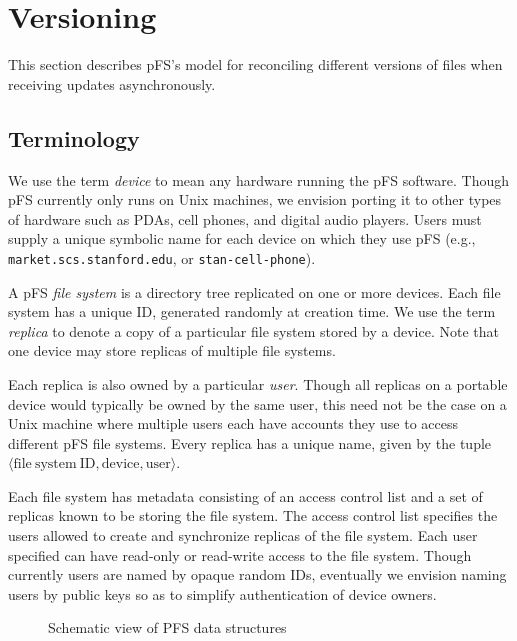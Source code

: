 
\section{Versioning}
\label{sec:vers}

This section describes pFS's model for reconciling different versions
of files when receiving updates asynchronously.

\subsection{Terminology}

We use the term \emph{device} to mean any hardware running the pFS
software.  Though pFS currently only runs on Unix machines, we
envision porting it to other types of hardware such as PDAs, cell
phones, and digital audio players.  Users must supply a unique
symbolic name for each device on which they use pFS (e.g.,
\texttt{market.scs.stanford.edu}, or \texttt{stan-cell-phone}).

A pFS \emph{file system} is a directory tree replicated on one or more
devices.  Each file system has a unique ID, generated randomly at
creation time.  We use the term \emph{replica} to denote a copy of a
particular file system stored by a device.  Note that one device may
store replicas of multiple file systems.

Each replica is also owned by a particular \emph{user}.  Though all
replicas on a portable device would typically be owned by the same
user, this need not be the case on a Unix machine where multiple users
each have accounts they use to access different pFS file systems.
Every replica has a unique name, given by the tuple $\langle
\mathrm{file\ system\ ID}, \mathrm{device}, \mathrm{user}\rangle$.

Each file system has metadata consisting of an access control list and
a set of replicas known to be storing the file system.  The access
control list specifies the users allowed to create and synchronize
replicas of the file system.  Each user specified can have read-only
or read-write access to the file system.  Though currently users are
named by opaque random IDs, eventually we envision naming users by
public keys so as to simplify authentication of device owners.

\begin{figure*}
\centerline{}
\caption{Schematic view of PFS data structures}
\label{fig:struct}
\end{figure*}

